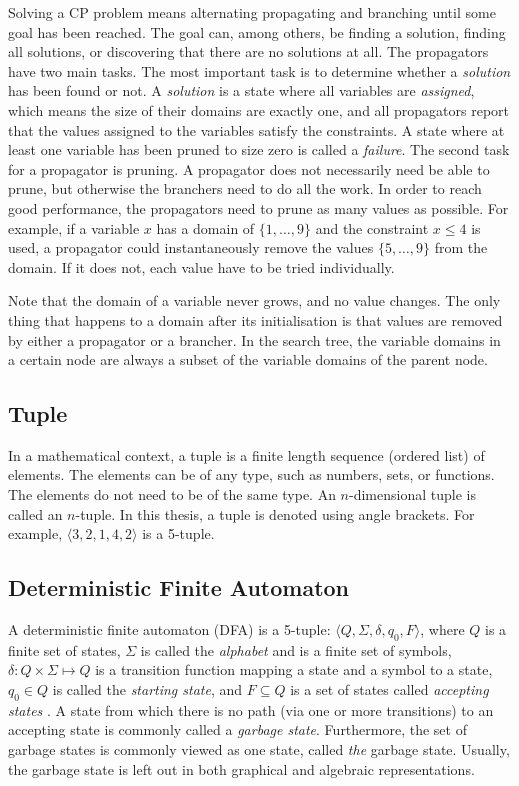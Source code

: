 \documentclass[a4paper,11pt]{article}
\begin{document}
Solving a CP problem means alternating propagating and branching until some goal has been reached. The goal can, among others, be finding a solution, finding all solutions, or discovering that there are no solutions at all. The propagators have two main tasks. The most important task is to determine whether a \textit{solution} has been found or not. A \textit{solution} is a state where all variables are \textit{assigned}, which means the size of their domains are exactly one, and all propagators report that the values assigned to the variables satisfy the constraints. A state where at least one variable has been pruned to size zero is called a \textit{failure}. The second task for a propagator is pruning. A propagator does not necessarily need be able to prune, but otherwise the branchers need to do all the work. In order to reach good performance, the propagators need to prune as many values as possible. For example, if a variable $x$ has a domain of $\{1,\ldots,9\}$ and the constraint $x\le 4$ is used, a propagator could instantaneously remove the values $\{5,\ldots,9\}$ from the domain. If it does not, each value have to be tried individually.

Note that the domain of a variable never grows, and no value changes. The only thing that happens to a domain after its initialisation is that values are removed by either a propagator or a brancher. In the search tree, the variable domains in a certain node are always a subset of the variable domains of the parent node. 

\subsection{Tuple}
In a mathematical context, a tuple is a finite length sequence (ordered list) of elements. The elements can be of any type, such as numbers, sets, or functions. The elements do not need to be of the same type. An $n$-dimensional tuple is called an $n$-tuple. In this thesis, a tuple is denoted using angle brackets. For example, $\langle 3, 2, 1, 4, 2 \rangle$ is a 5-tuple. 

\subsection{Deterministic Finite Automaton}
\label{sec:dfa}
A deterministic finite automaton (DFA) is a 5-tuple: $\langle Q,\Sigma,\delta,q_0, F\rangle$, where $Q$ is a finite set of states, $\Sigma$ is called the \textit{alphabet} and is a finite set of symbols, $\delta : Q \times \Sigma \mapsto Q$  is a transition function mapping a state and a symbol to a state, $q_0\in Q$ is called the \textit{starting state}, and $F\subseteq Q$  is a set of states called \textit{accepting states} \cite{hopcroft2001introduction}. A state from which there is no path (via one or more transitions) to an accepting state is commonly called a \textit{garbage state}. Furthermore, the set of garbage states is commonly viewed as one state, called \textit{the} garbage state. Usually, the garbage state is left out in both graphical and algebraic representations. 
\end{document}
